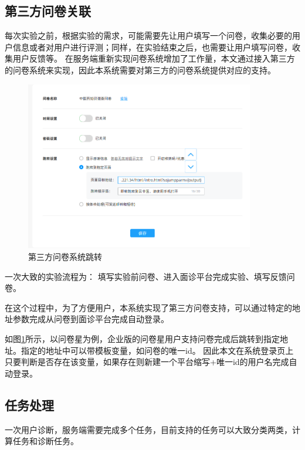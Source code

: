 \subsection{第三方问卷关联}
每次实验之前，根据实验的需求，可能需要先让用户填写一个问卷，收集必要的用户信息或者对用户进行评测；同样，在实验结束之后，也需要让用户填写问卷，收集用户反馈等。
在服务端重新实现问卷系统增加了工作量，本文通过接入第三方的问卷系统来实现，因此本系统需要对第三方的问卷系统提供对应的支持。


\begin{figure}[h]
    \centering
    \includegraphics[width=10cm]{images/wjx1.png}
    \caption{第三方问卷系统跳转}
    \label{fig:wjx-ssojump}
\end{figure}

一次大致的实验流程为： 填写实验前问卷、进入面诊平台完成实验、填写反馈问卷。

在这个过程中，为了方便用户，本系统实现了第三方问卷支持，可以通过特定的地址参数完成从问卷到面诊平台完成自动登录。

如图\ref{fig:wjx-ssojump}所示，以问卷星为例，企业版的问卷星用户支持问卷完成后跳转到指定地址。指定的地址中可以带模板变量，如问卷的唯一id。
因此本文在系统登录页上只要判断是否存在该变量，如果存在则新建一个平台缩写+唯一id的用户名完成自动登录。


\subsection{任务处理}
一次用户诊断，服务端需要完成多个任务，目前支持的任务可以大致分类两类，计算任务和诊断任务。


